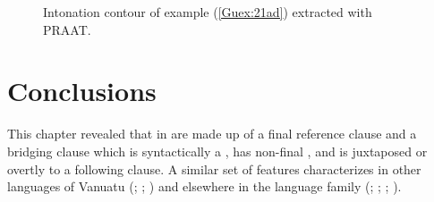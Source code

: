 \documentclass[output=paper]{LSP/langsci}
\begin{document}
\begin{figure}[ht]
\caption{Intonation contour of example (\ref{Guex:21ad}) extracted with PRAAT. \label{GuF8}}
\end{figure}




\section{Conclusions}
\label{Guconclu}
This chapter  revealed that  in  are made up of a final reference clause and a bridging clause which is syntactically a , has non-final , and is juxtaposed or overtly  to a following clause. A similar set of features characterizes  in other languages of Vanuatu (\citealt[][24--26]{Schneider09}; \citealt[][327]{Thieberger06}; \citealt[][426]{hyslop01}) and elsewhere in the  language family (\citealt{palmer09,Frostad2012}; \citealt[][172]{hamel88}; \citealt[][115--116]{Schokkin14}; \citealt[][94]{Lithgow95}). 
\end{document}
